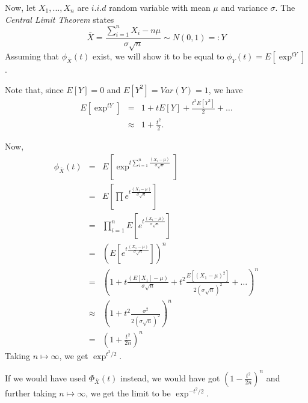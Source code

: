 \documentclass[11pt,twoside,reqno]{article}
\newcommand{\e}{\exp}
\newcommand{\s}{\sigma}
\begin{document}
Now, let $X_1,...,X_n$ are $i.i.d$ random variable with mean $\mu$ and variance $\s$. The \textit{Central Limit Theorem} states 
\[
\bar{X} = \frac{\sum_{i=1}^{n} X_i-n \mu}{\s\sqrt{n}} \sim N(0,1) =: Y
\]
Assuming that $\phi_{\bar{X}}(t)$ exist, we will show it to be equal to $\phi_{Y}(t) = E[\e^{tY}]$.

Note that, since $E[Y] = 0$ and $E[Y^2] = Var(Y) = 1$, we have
\begin{eqnarray*}
E[\e^{tY}] &=& 1 + tE[Y] + \frac{t^2E[Y^2]}{2} + \ldots \\
&\approx& 1 + \frac{t^2}{2}.
\end{eqnarray*}

Now, 
\begin{eqnarray*}
\phi_{\bar{X}}(t) &=& E[\e^{t\sum_{i=1}^n \frac{(X_i -\mu)}{\s\sqrt{n}}}] \\
&=& E[\prod e^{t\frac{(X_i -\mu)}{\s\sqrt{n}}}] \\
&=& \prod_{i=1}^{n} E[e^{t\frac{(X_i -\mu)}{\s\sqrt{n}}}] \\
&=& \left( E[e^{t\frac{(X_1 -\mu)}{\s\sqrt{n}}}] \right)^n \\
&=& \left( 1+  t\frac{(E[X_1] -\mu)}{\s\sqrt{n}} +  t^2\frac{E[(X_1 -\mu)^2]}{2( \s\sqrt{n})^2} + \ldots \right)^n \\
&\approx& \left(1 +  t^2\frac{\s^2}{2(\s\sqrt{n})^2} \right)^n \\
&=& \left(1 +    \frac{t^2}{2n} \right)^n 
\end{eqnarray*}
Taking $n \mapsto \infty$, we get $\e^{t^2/2}$. 

If we would have used $\Phi_{\bar{X}}(t)$ instead, we would have got $\left(1 -  \frac{t^2}{2n} \right)^n$ and further taking $n \mapsto \infty$, we get the limit to be $\e^{-t^2/2}$. 
\end{document}
